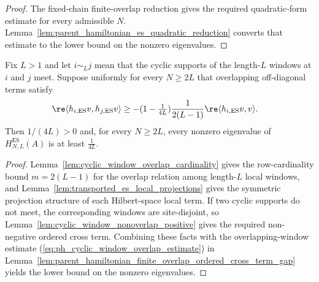 \begin{proof}
    \leanok
    The fixed-chain finite-overlap reduction gives the required quadratic-form
    estimate for every admissible $N$.
    Lemma~\ref{lem:parent_hamiltonian_es_quadratic_reduction} converts that
    estimate to the lower bound on the nonzero eigenvalues.
\end{proof}

\begin{lemma}
    \label{lem:parent_hamiltonian_cyclic_window_ordered_cross_term_gap}
    \leanok
    Fix $L>1$ and let $i\sim_L j$ mean that the cyclic supports of the
    length-$L$ windows at $i$ and $j$ meet. Suppose uniformly for every
    $N\ge2L$ that overlapping off-diagonal terms satisfy
    \begin{align}
        \re\langle h_{i,\mathrm{ES}}v,h_{j,\mathrm{ES}}v\rangle
         & \ge -(1-\tfrac{1}{4L})\frac{1}{2(L-1)}
        \re\langle h_{i,\mathrm{ES}}v,v\rangle.
        \label{eq:ph_cyclic_window_overlap_estimate}
    \end{align}
    Then $1/(4L)>0$ and, for every $N\ge2L$, every nonzero eigenvalue of
    $H_{N,L}^{\mathrm{ES}}(A)$ is at least $\frac{1}{4L}$.
\end{lemma}

\begin{proof}
    \leanok
    Lemma~\ref{lem:cyclic_window_overlap_cardinality} gives the row-cardinality
    bound $m=2(L-1)$ for the overlap relation among length-$L$ local windows,
    and
    Lemma~\ref{lem:transported_es_local_projections} gives the symmetric
    projection structure of each Hilbert-space local term. If two cyclic supports
    do not meet, the corresponding windows are site-disjoint, so
    Lemma~\ref{lem:cyclic_window_nonoverlap_positive} gives the required
    non-negative ordered cross term. Combining these facts with the
    overlapping-window estimate (\ref{eq:ph_cyclic_window_overlap_estimate}) in
    Lemma~\ref{lem:parent_hamiltonian_finite_overlap_ordered_cross_term_gap}
    yields the lower bound on the nonzero eigenvalues.
\end{proof}

